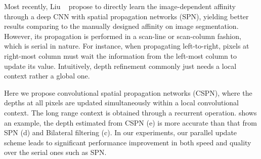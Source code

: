 Most recently, Liu \etal~\cite{liu2017learning} propose to directly learn the image-dependent affinity through a deep CNN with spatial propagation networks (SPN), yielding better results comparing to the manually designed affinity on image segmentation. 
However, its propagation is performed in a scan-line or scan-column fashion, which is serial in nature. For instance, when propagating left-to-right, pixels at right-most column must wait the information from the left-most column to update its value. 
Intuitively, depth refinement commonly just needs a local context rather a global one. 

Here we propose convolutional spatial propagation networks (CSPN), where the depths at all pixels are updated simultaneously within a local convolutional context. The long range context is obtained through a recurrent operation.  shows an example, the depth estimated from CSPN (e) is more accurate than that from SPN (d) and Bilateral filtering (c). In our experiments, our parallel update scheme leads to significant performance improvement in both speed and quality over the serial ones such as SPN.

